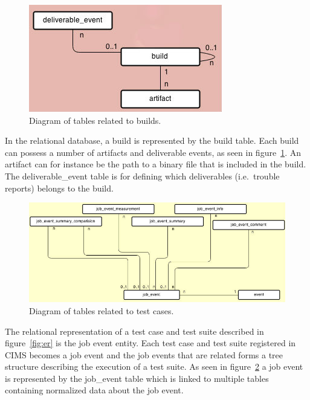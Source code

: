 \begin{figure}[h!]
\centering
\includegraphics[scale=0.5]{figure/build.jpg}
\caption{Diagram of tables related to builds.}
\label{fig:build}
\end{figure}
In the relational database, a build is represented by the build table. Each build can possess a number of artifacts and deliverable events, as seen in figure~\ref{fig:build}. An artifact can for instance be the path to a binary file that is included in the build. The deliverable\_event table is for defining which deliverables (i.e.\ trouble reports) belongs to the build.
\label{sec:jobEvent}
\begin{figure}[h!]
\centering
\includegraphics[scale=0.5]{figure/job_event.jpg}
\caption{Diagram of tables related to test cases.}
\label{fig:job_event}
\end{figure}
The relational representation of a test case and test suite described in figure~\ref{fig:er} is the job event entity. Each test case and test suite registered in CIMS becomes a job event and the job events that are related forms a tree structure describing the execution of a test suite. As seen in figure~\ref{fig:job_event} a job event is represented by the job\_event table which is linked to multiple tables containing normalized data about the job event.


